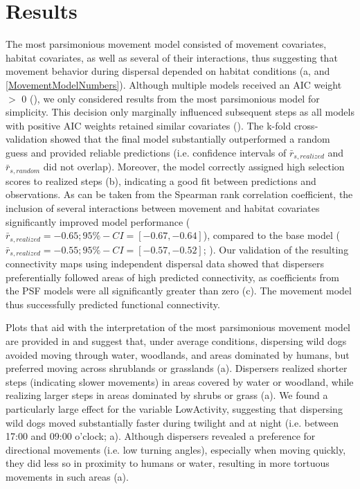 \documentclass[../FinalThesis.tex]{subfiles}
\begin{document}
\section{Results}

The most parsimonious movement model consisted of movement covariates, habitat
covariates, as well as several of their interactions, thus suggesting that
movement behavior during dispersal depended on habitat conditions
(a,  and \cref{MovementModelNumbers}).
Although multiple models received an AIC weight \(>\) 0 (), we
only considered results from the most parsimonious model for simplicity. This
decision only marginally influenced subsequent steps as all models with positive
AIC weights retained similar covariates (). The k-fold
cross-validation showed that the final model substantially outperformed a random
guess and provided reliable predictions (i.e. confidence intervals of
\(\bar{r}_{s, realized}\) and \(\bar{r}_{s, random}\) did not overlap).
Moreover, the model correctly assigned high selection scores to realized steps
(b), indicating a good fit between predictions and
observations. As can be taken from the Spearman rank correlation coefficient,
the inclusion of several interactions between movement and habitat covariates
significantly improved model performance (\(\bar{r}_{s, realized} = -0.65;
95\%-CI = [-0.67, -0.64]\)), compared to the base model (\(\bar{r}_{s, realized}
= -0.55; 95\%-CI = [-0.57, -0.52]\); \citealp{Hofmann.2021}). Our validation of
the resulting connectivity maps using independent dispersal data showed that
dispersers preferentially followed areas of high predicted connectivity, as
coefficients from the PSF models were all significantly greater than zero
(c). The movement model thus successfully predicted
functional connectivity.

Plots that aid with the interpretation of the most parsimonious movement model
are provided in  and suggest that, under average
conditions, dispersing wild dogs avoided moving through water, woodlands, and
areas dominated by humans, but preferred moving across shrublands or grasslands
(a). Dispersers realized shorter steps (indicating slower
movements) in areas covered by water or woodland, while realizing larger steps
in areas dominated by shrubs or grass (a). We found a
particularly large effect for the variable \textsf{LowActivity}, suggesting that
dispersing wild dogs moved substantially faster during twilight and at night
(i.e. between 17:00 and 09:00 o'clock; a). Although
dispersers revealed a preference for directional movements (i.e. low turning
angles), especially when moving quickly, they did less so in proximity to humans
or water, resulting in more tortuous movements in such areas
(a).
\end{document}
